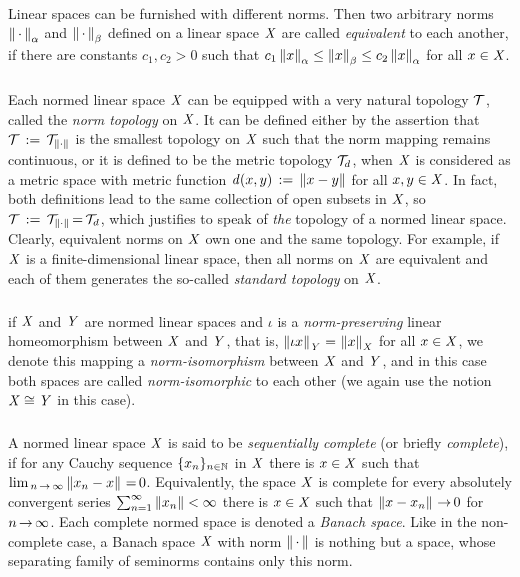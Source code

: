 \documentclass[11pt,twoside]{article}
\begin{document}
\paragraph*{}
Linear spaces can be furnished with different norms.
Then two arbitrary norms $\left\lVert \,\cdot\, \right\rVert_{\alpha}$
and $\left\lVert \,\cdot\, \right\rVert_{\beta}$ defined on a linear space $\mathit{X}$
are called \textit{equivalent} to each another,
if there are constants $c_1,c_2 > 0$ such that
$
c_1 \left\lVert x \right\rVert_{\alpha} \leq \left\lVert x \right\rVert_{\beta}  \leq c_2 \left\lVert x \right\rVert_{\alpha} 
$
for all $x \in \mathit{X}$.

\subparagraph*{} %
Each normed linear space $\mathit{X}$ can be equipped
with a very natural topology $\mathcal{T}$,
called the \textit{norm topology} on $\mathit{X}$.
It can be defined either by the assertion
that $\mathcal{T} \,:=\, \mathcal{T}_{\left\lVert \cdot \right\rVert}$ is the smallest topology on $\mathit{X}$
such that the norm mapping remains continuous,
or it is defined to be the metric topology $\mathcal{T}_d$,
when $\mathit{X}$ is considered as a metric space with metric function
$\mathit{d}(x,y) \,:=\, \left\lVert x-y \right\rVert$ for all $x,y \in \mathit{X}$.
In fact,
both definitions lead to the same collection of open subsets in $\mathit{X}$,
so $\mathcal{T} \,:=\, \mathcal{T}_{\left\lVert \cdot \right\rVert} {\,=\,} \mathcal{T}_d$,
which justifies to speak of \textit{the} topology of a normed linear space.
Clearly,
equivalent norms on $\mathit{X}$ own one and the same topology.
For example,
if $\mathit{X}$ is a finite-dimensional linear space,
then all norms on $\mathit{X}$ are equivalent and each of them
generates the so-called \textit{standard topology} on $\mathit{X}$.

\subparagraph*{} %
if $\mathit{X}$ and $\mathit{Y}$ are normed linear spaces
and $\iota$ is a \textit{norm-preserving} linear homeomorphism
between $\mathit{X}$ and $\mathit{Y}$,
that is,
$\left\lVert \iota x \right\rVert_{\mathit{Y}} {\,=\,} \left\lVert x \right\rVert_{\mathit{X}}$ for all $x \in \mathit{X}$,
we denote this mapping a \textit{norm-isomorphism} between $\mathit{X}$ and $\mathit{Y}$,
and in this case both spaces are called \textit{norm-isomorphic} to each other
(we again use the notion $\mathit{X} \cong \mathit{Y}$ in this case).

\subparagraph*{} %
A normed linear space $\mathit{X}$ is said to be \textit{sequentially complete}
(or briefly \textit{complete}),
if for any Cauchy sequence $\{x_n\}_{n \in {\mathbb{N}}}$ in $\mathit{X}$
there is $x \in \mathit{X}$
such that $\lim_{\,n {\,\to\,} \infty} \left\lVert x_n-x \right\rVert {\,=\,} 0$.
Equivalently,
the space $\mathit{X}$ is complete
\iff
for every absolutely convergent series
$\sum_{n=1}^{\infty} \left\lVert x_n \right\rVert < \infty$ there is $x \in \mathit{X}$
such that $\left\lVert x-x_n \right\rVert {\,\to\,} 0$ for $n {\,\to\,} \infty$.
Each complete normed space is denoted a \textit{Banach space}.
Like in the non-complete case,
a Banach space $\mathit{X}$ with norm $\left\lVert \,\cdot\, \right\rVert$
is nothing but a {\FRECHET} space,
whose separating family of seminorms contains only this norm.
\end{document}
